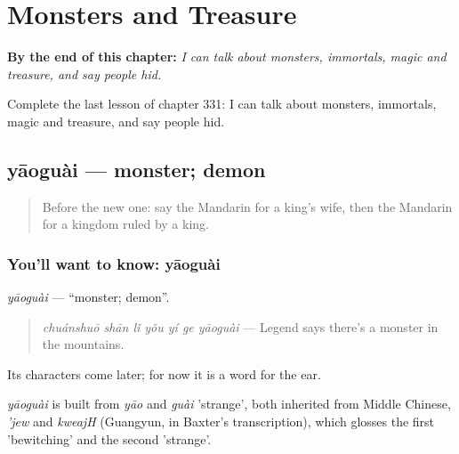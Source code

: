 
\chapter{Monsters and Treasure}
\label{ch:zh-monsters-and-treasure}

\begin{chapteropening}
\textbf{By the end of this chapter:} \emph{I can talk about monsters, immortals, magic and treasure, and say people hid.}

Complete the last lesson of chapter 331: I can talk about monsters, immortals, magic and treasure, and say people hid.
\end{chapteropening}

\section[yāoguài]{yāoguài — monster; demon}

\label{lesson:ZH-C331-yaoguai}



\begin{quote}
Before the new one: say the Mandarin for a king's wife, then the Mandarin for a kingdom ruled by a king.
\end{quote}

\subsection*{You'll want to know: yāoguài}
\emph{yāoguài} — \textquotedblleft{}monster; demon\textquotedblright{}.

\begin{quote}
\emph{chuánshuō shān lǐ yǒu yí ge yāoguài} — Legend says there's a monster in the mountains.
\end{quote}

Its characters come later; for now it is a word for the ear.

\begin{cousinweb}
\emph{yāoguài} is built from \emph{yāo} and \emph{guài} 'strange', both inherited from Middle Chinese, \emph{'jew} and \emph{kweajH} (Guangyun, in Baxter's transcription), which glosses the first 'bewitching' and the second 'strange'.
\end{cousinweb}

